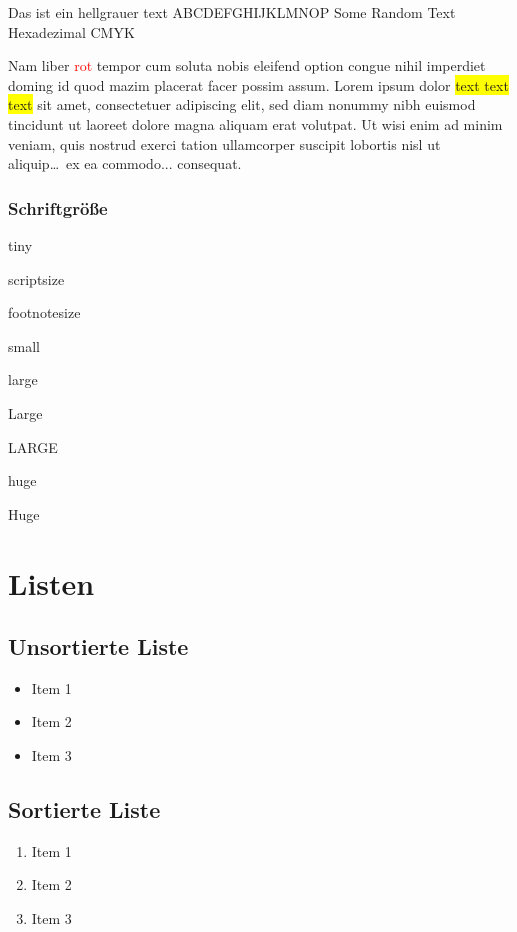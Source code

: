 \documentclass[a4paper, 12pt]{report}
\begin{document}
	\textcolor{hellgrau}{Das ist ein hellgrauer text}
	\textcolor{farbe}{ABCDEFGHIJKLMNOP}
	\textcolor{farbe2}{Some Random Text}
	\textcolor{farbe3}{Hexadezimal}
	\textcolor{farbe4}{CMYK}
	
	Nam liber \textcolor{red}{rot} tempor cum soluta nobis eleifend option congue nihil imperdiet doming id quod mazim placerat facer possim assum. Lorem ipsum dolor \colorbox{yellow}{text text text} sit amet, consectetuer adipiscing elit, sed diam nonummy nibh euismod tincidunt ut laoreet dolore magna aliquam erat volutpat. Ut wisi enim ad minim veniam, quis nostrud exerci tation ullamcorper suscipit lobortis nisl ut aliquip\ldots ~ex ea commodo... consequat.
	\clearpage
	
	\subsection{Schriftgröße}
	\tiny
	tiny
	\normalsize
	
	\scriptsize
	scriptsize
	\normalsize
	
	\footnotesize
	footnotesize
	\normalsize
	
	\small
	small
	
	\large
	large
	
	\Large
	Large
	
	\LARGE
	LARGE
	
	\huge
	huge
	
	\Huge
	Huge
	
	\normalsize
	
	\chapter{Listen}
	
	\section{Unsortierte Liste}
	\begin{itemize}
		\item Item 1
		\item Item 2
		\item Item 3
	\end{itemize}

	\section{Sortierte Liste}
	\begin{enumerate}
		\item Item 1
		\item Item 2
		\item Item 3
	\end{enumerate}
\end{document}
